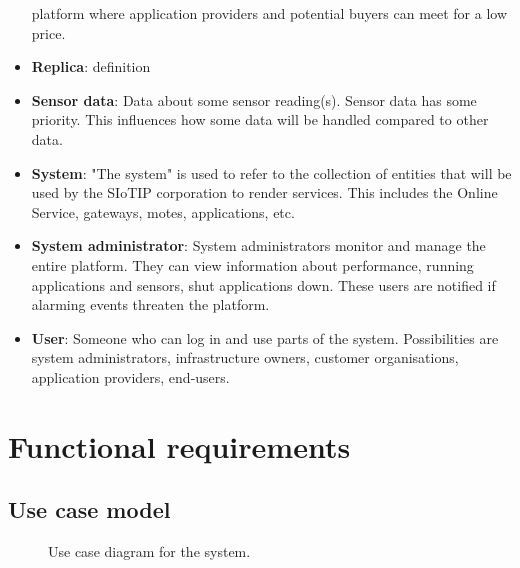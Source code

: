 \documentclass[english]{sareport}
\begin{document}
\begin{itemize}
    platform where application providers and potential buyers can meet for a low price.
    \item \textbf{Replica}: definition
    \item \textbf{Sensor data}: Data about some sensor reading(s). Sensor
    data has some priority. This influences how some data will be handled
    compared to other data.
    \item \textbf{System}: "The system" is used to refer to the collection
    of entities that will be used by the SIoTIP corporation to render services.
    This includes the Online Service, gateways, motes, applications, etc.
    \item \textbf{System administrator}: System administrators monitor and
    manage the entire platform. They can view information about performance,
    running applications and sensors, shut applications down. These users are
    notified if alarming events threaten the platform.
    \item \textbf{User}: Someone who can log in and use parts of the system.
    Possibilities are system administrators, infrastructure owners, customer
    organisations, application providers, end-users.
\end{itemize}

\chapter{Functional requirements}\label{sec:functional}
\section*{Use case model}

\begin{figure}[!htp]
    \centering
    \caption{Use case diagram for the system.}\label{fig:use_case_model}
\end{figure}



\end{document}
